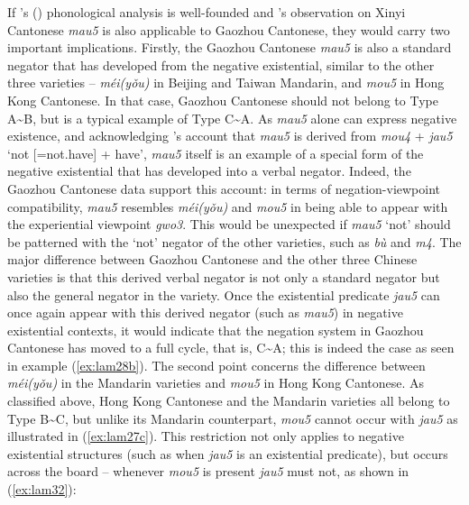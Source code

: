 \documentclass[output=paper]{langscibook}
\begin{document}
If \citeauthor{Law2014}'s (\citeyear{Law2014}) phonological analysis is well-founded and \citeauthor{Zhang2002}'s observation on Xinyi Cantonese \textit{mau5} is also applicable to Gaozhou Cantonese, they would carry two important implications. Firstly, the Gaozhou Cantonese \textit{mau5} is also a standard negator that has developed from the negative existential, similar to the other three varieties – \textit{méi(yǒu)} in Beijing and Taiwan Mandarin, and \textit{mou5} in Hong Kong Cantonese. In that case, Gaozhou Cantonese should not belong to Type A\sim B, but is a typical example of Type C\sim A. As \textit{mau5} alone can express negative existence, and acknowledging \citeauthor{Zhang2002}'s account that \textit{mau5} is derived from \textit{mou4} + \textit{jau5} `not [=not.have] + have',  \textit{mau5} itself is an example of a special form of the negative existential that has developed into a verbal negator. Indeed, the Gaozhou Cantonese data support this account: in terms of negation-viewpoint compatibility, \textit{mau5} resembles \textit{méi(yǒu)} and \textit{mou5} in being able to appear with the experiential viewpoint \textit{gwo3}. This would be unexpected if \textit{mau5} `not' should be patterned with the `not' negator of the other varieties, such as \textit{bù} and \textit{m4}. The major difference between Gaozhou Cantonese and the other three Chinese varieties is that this derived verbal negator is not only a standard negator but also the general negator in the variety. Once the existential predicate \textit{jau5} can once again appear with this derived negator (such as \textit{mau5}) in negative existential contexts, it would indicate that the negation system in Gaozhou Cantonese has moved to a full cycle, that is, C\sim A; this is indeed the case as seen in example (\ref{ex:lam28b}). The second point concerns the difference between \textit{méi(yǒu)} in the Mandarin varieties and \textit{mou5} in Hong Kong Cantonese. As classified above, Hong Kong Cantonese and the Mandarin varieties all belong to Type B\sim C, but unlike its Mandarin counterpart, \textit{mou5} cannot occur with \textit{jau5} as illustrated in (\ref{ex:lam27c}). This restriction not only applies to negative existential structures (such as when \textit{jau5} is an existential predicate), but occurs across the board – whenever \textit{mou5} is present \textit{jau5} must not, as shown in (\ref{ex:lam32}): 
\end{document}
